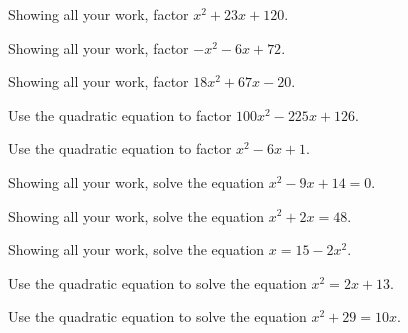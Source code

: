 \documentclass[11pt,letterpaper]{article}
\begin{document}

 Showing all your work, factor $x^2 + 23x + 120$. \pspace



\newpage



 Showing all your work, factor $-x^2 - 6x + 72$. \pspace



\newpage



 Showing all your work, factor $18x^2 + 67x - 20$. \pspace



\newpage



 Use the quadratic equation to factor $100x^2 - 225x + 126$. \pspace



\newpage



 Use the quadratic equation to factor $x^2 - 6x + 1$. \pspace



\newpage



 Showing all your work, solve the equation $x^2 - 9x + 14= 0$. \pspace



\newpage



 Showing all your work, solve the equation $x^2 + 2x= 48$. \pspace



\newpage



 Showing all your work, solve the equation $x= 15 - 2x^2$. \pspace



\newpage



 Use the quadratic equation to solve the equation $x^2= 2x + 13$. \pspace



\newpage



 Use the quadratic equation to solve the equation $x^2 + 29= 10x$. \pspace
\end{document}
